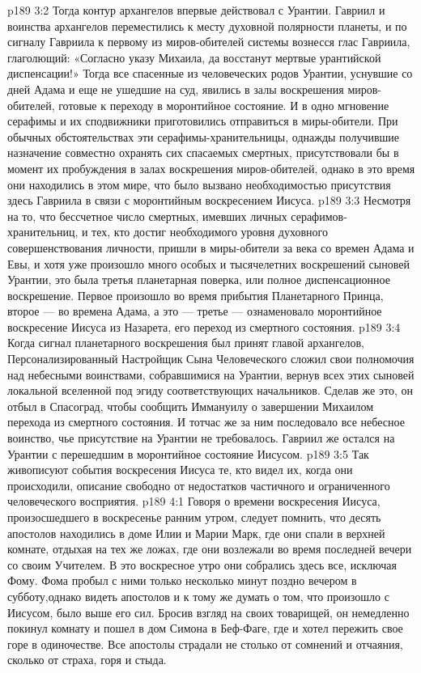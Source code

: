 \vs p189 3:2 Тогда контур архангелов впервые действовал с Урантии. Гавриил и воинства архангелов переместились к месту духовной полярности планеты, и по сигналу Гавриила к первому из миров\hyp{}обителей системы вознесся глас Гавриила, глаголющий: «Согласно указу Михаила, да восстанут мертвые урантийской диспенсации!» Тогда все спасенные из человеческих родов Урантии, уснувшие со дней Адама и еще не ушедшие на суд, явились в залы воскрешения миров\hyp{}обителей, готовые к переходу в моронтийное состояние. И в одно мгновение серафимы и их сподвижники приготовились отправиться в миры\hyp{}обители. При обычных обстоятельствах эти серафимы\hyp{}хранительницы, однажды получившие назначение совместно охранять сих спасаемых смертных, присутствовали бы в момент их пробуждения в залах воскрешения миров\hyp{}обителей, однако в это время они находились в этом мире, что было вызвано необходимостью присутствия здесь Гавриила в связи с моронтийным воскресением Иисуса.
\vs p189 3:3 Несмотря на то, что бессчетное число смертных, имевших личных серафимов\hyp{}хранительниц, и тех, кто достиг необходимого уровня духовного совершенствования личности, пришли в миры\hyp{}обители за века со времен Адама и Евы, и хотя уже произошло много особых и тысячелетних воскрешений сыновей Урантии, это была третья планетарная поверка, или полное диспенсационное воскрешение. Первое произошло во время прибытия Планетарного Принца, второе --- во времена Адама, а это --- третье --- ознаменовало моронтийное воскресение Иисуса из Назарета, его переход из смертного состояния.
\vs p189 3:4 \pc Когда сигнал планетарного воскрешения был принят главой архангелов, Персонализированный Настройщик Сына Человеческого сложил свои полномочия над небесными воинствами, собравшимися на Урантии, вернув всех этих сыновей локальной вселенной под эгиду соответствующих начальников. Сделав же это, он отбыл в Спасоград, чтобы сообщить Иммануилу о завершении Михаилом перехода из смертного состояния. И тотчас же за ним последовало все небесное воинство, чье присутствие на Урантии не требовалось. Гавриил же остался на Урантии с перешедшим в моронтийное состояние Иисусом.
\vs p189 3:5 \pc Так живописуют события воскресения Иисуса те, кто видел их, когда они происходили, описание свободно от недостатков частичного и ограниченного человеческого восприятия.
\vs p189 4:1 Говоря о времени воскресения Иисуса, произосшедшего в воскресенье ранним утром, следует помнить, что десять апостолов находились в доме Илии и Марии Марк, где они спали в верхней комнате, отдыхая на тех же ложах, где они возлежали во время последней вечери со своим Учителем. В это воскресное утро они собрались здесь все, исключая Фому. Фома пробыл с ними только несколько минут поздно вечером в субботу,однако видеть апостолов и к тому же думать о том, что произошло с Иисусом, было выше его сил. Бросив взгляд на своих товарищей, он немедленно покинул комнату и пошел в дом Симона в Беф\hyp{}Фаге, где и хотел пережить свое горе в одиночестве. Все апостолы страдали не столько от сомнений и отчаяния, сколько от страха, горя и стыда.

